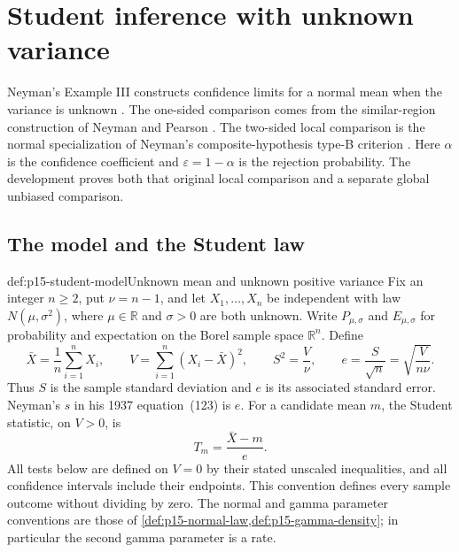 \chapter{Student inference with unknown variance}
\label{sec:p15-student-inference}

Neyman's Example III constructs confidence limits for a normal
mean when the variance is unknown
\cite[pp.~376--378, equations~(121)--(130)]{Neyman1937Confidence}.
The one-sided comparison comes from the similar-region construction
of Neyman and Pearson
\cite[pp.~313--321, Examples~7--8]{NeymanPearson1933Tests}.
The two-sided local comparison is the normal specialization of
Neyman's composite-hypothesis type-B criterion
\cite[pp.~251--265]{Neyman1935CompositeHypotheses}.
Here \(\alpha\) is the confidence coefficient and
\(\varepsilon=1-\alpha\) is the rejection probability.
The development proves both that original local comparison and
a separate global unbiased comparison.

\section{The model and the Student law}

\begin{hbdefinition}{def:p15-student-model}{Unknown mean and unknown positive variance}
Fix an integer \(n\geq2\), put \(\nu=n-1\), and let
\(X_1,\ldots,X_n\) be independent with law \(N(\mu,\sigma^2)\),
where \(\mu\in\mathbb R\) and \(\sigma>0\) are both unknown.
Write \(P_{\mu,\sigma}\) and \(E_{\mu,\sigma}\) for probability
and expectation on the Borel sample space \(\mathbb R^n\). Define
\[
 \bar X=\frac1n\sum_{i=1}^nX_i,\qquad
 V=\sum_{i=1}^n(X_i-\bar X)^2,\qquad
 S^2=\frac V\nu,\qquad e=\frac S{\sqrt n}
                       =\sqrt{\frac{V}{n\nu}}.
\]
Thus \(S\) is the sample standard deviation and \(e\) is its
associated standard error. Neyman's \(s\) in his 1937
equation~(123) is \(e\). For a candidate mean \(m\), the
Student statistic, on \(V>0\), is
\[
                         T_m=\frac{\bar X-m}{e}.
\]
All tests below are defined on \(V=0\) by their stated unscaled
inequalities, and all confidence intervals include their endpoints.
This convention defines every sample outcome without dividing by zero.
The normal and gamma parameter conventions are those of
\cref{def:p15-normal-law,def:p15-gamma-density}; in particular
the second gamma parameter is a rate.
\end{hbdefinition}

